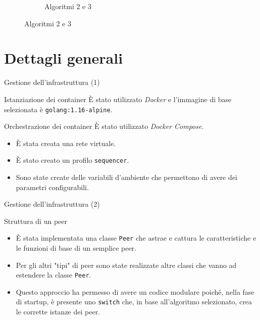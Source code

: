 \documentclass[
	usepdftitle=false,
	xcolor={table, dvipsnames},
	hyperref={
		pdftitle={Multicast totalmente e causalmente ordinato in Go},
    	pdfauthor={A. Chillotti}
    }
]{beamer}
\begin{document}
\begin{frame}
\begin{figure}[ht!]
\begin{subfigure}[ht]{0.4\textwidth}
         \caption{Algoritmi 2 e 3}
         \label{fig:arch-2-3}
     \end{subfigure}
\end{figure}

\end{frame}

\section{Dettagli generali}
\begin{frame}{Gestione dell'infrastruttura (1)}

\begin{block}{Istanziazione dei container}
È stato utilizzato \textit{Docker} e l'immagine di base selezionata è \texttt{golang:1.16-alpine}.
\end{block}

\begin{block}{Orchestrazione dei container}
È stato utilizzato \textit{Docker Compose}.
\begin{itemize}
\item È stata creata una rete virtuale.
\item È stato creato un profilo \texttt{sequencer}.
\item Sono state create delle variabili d'ambiente che permettono di avere dei parametri configurabili.
\end{itemize}
\end{block}

\end{frame}

\begin{frame}{Gestione dell'infrastruttura (2)}

\begin{block}{Struttura di un peer}
\begin{itemize}
\item È stata implementata una classe \texttt{Peer} che astrae e cattura le caratteristiche e le funzioni di base di un semplice peer.
\item Per gli altri "tipi" di peer sono state realizzate altre classi che vanno ad estendere la classe \texttt{Peer}.
\item Questo approccio ha permesso di avere un codice modulare poiché, nella fase di startup, è presente uno \texttt{switch} che, in base all'algoritmo selezionato, crea le corrette istanze dei peer.
\end{itemize}
\end{block}

\end{frame}
\end{document}
